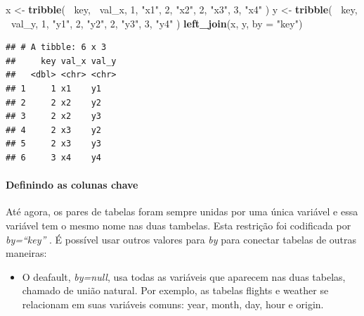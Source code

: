 \documentclass[
]{article}
\newenvironment{Shaded}{\begin{snugshade}}{\end{snugshade}}
\newcommand{\DataTypeTok}[1]{\textcolor[rgb]{0.13,0.29,0.53}{#1}}
\newcommand{\DecValTok}[1]{\textcolor[rgb]{0.00,0.00,0.81}{#1}}
\newcommand{\KeywordTok}[1]{\textcolor[rgb]{0.13,0.29,0.53}{\textbf{#1}}}
\newcommand{\NormalTok}[1]{#1}
\newcommand{\OperatorTok}[1]{\textcolor[rgb]{0.81,0.36,0.00}{\textbf{#1}}}
\newcommand{\StringTok}[1]{\textcolor[rgb]{0.31,0.60,0.02}{#1}}
\providecommand{\tightlist}{%
  \setlength{\itemsep}{0pt}\setlength{\parskip}{0pt}}
\begin{document}
\begin{Shaded}
\begin{Highlighting}[]
\NormalTok{x <-}\StringTok{ }\KeywordTok{tribble}\NormalTok{(}
  \OperatorTok{~}\NormalTok{key, }\OperatorTok{~}\NormalTok{val_x,}
     \DecValTok{1}\NormalTok{, }\StringTok{"x1"}\NormalTok{,}
     \DecValTok{2}\NormalTok{, }\StringTok{"x2"}\NormalTok{,}
     \DecValTok{2}\NormalTok{, }\StringTok{"x3"}\NormalTok{,}
     \DecValTok{3}\NormalTok{, }\StringTok{"x4"}
\NormalTok{)}
\NormalTok{y <-}\StringTok{ }\KeywordTok{tribble}\NormalTok{(}
  \OperatorTok{~}\NormalTok{key, }\OperatorTok{~}\NormalTok{val_y,}
     \DecValTok{1}\NormalTok{, }\StringTok{"y1"}\NormalTok{,}
     \DecValTok{2}\NormalTok{, }\StringTok{"y2"}\NormalTok{,}
     \DecValTok{2}\NormalTok{, }\StringTok{"y3"}\NormalTok{,}
     \DecValTok{3}\NormalTok{, }\StringTok{"y4"}
\NormalTok{)}
\KeywordTok{left_join}\NormalTok{(x, y, }\DataTypeTok{by =} \StringTok{"key"}\NormalTok{)}
\end{Highlighting}
\end{Shaded}

\begin{verbatim}
## # A tibble: 6 x 3
##     key val_x val_y
##   <dbl> <chr> <chr>
## 1     1 x1    y1   
## 2     2 x2    y2   
## 3     2 x2    y3   
## 4     2 x3    y2   
## 5     2 x3    y3   
## 6     3 x4    y4
\end{verbatim}

\hypertarget{definindo-as-colunas-chave}{%
\paragraph{Definindo as colunas
chave}\label{definindo-as-colunas-chave}}

Até agora, os pares de tabelas foram sempre unidas por uma única
variável e essa variável tem o mesmo nome nas duas tambelas. Esta
restrição foi codificada por \emph{by=``key''} . É possível usar outros
valores para \emph{by} para conectar tabelas de outras maneiras:

\begin{itemize}
\tightlist
\item
  O deafault, \emph{by=null}, usa todas as variáveis que aparecem nas
  duas tabelas, chamado de união natural. Por exemplo, as tabelas
  flights e weather se relacionam em suas variáveis comuns: year, month,
  day, hour e origin.
\end{itemize}

\begin{Shaded}
\end{Shaded}
\end{document}
